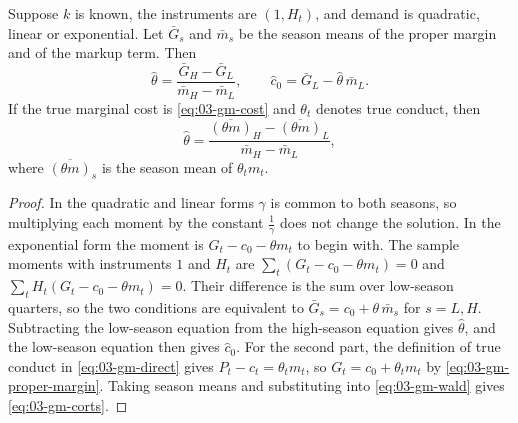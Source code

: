 \begin{proposition}\label{prop:03-gm-wald}
Suppose $k$ is known, the instruments are $(1, H_t)$, and demand is quadratic, linear or exponential. Let $\bar G_s$ and $\bar m_s$ be the season means of the proper
margin and of the markup term. Then
\begin{equation}\label{eq:03-gm-wald}
\hat\theta = \frac{\bar G_H - \bar G_L}{\bar m_H - \bar m_L},
\qquad
\hat c_0 = \bar G_L - \hat\theta\,\bar m_L .
\end{equation}
If the true marginal cost is \eqref{eq:03-gm-cost} and $\theta_t$ denotes true conduct, then
\begin{equation}\label{eq:03-gm-corts}
\hat\theta = \frac{\overline{(\theta m)}_H - \overline{(\theta m)}_L}{\bar m_H - \bar m_L},
\end{equation}
where $\overline{(\theta m)}_s$ is the season mean of $\theta_t m_t$.
\end{proposition}

\begin{proof}
In the quadratic and linear forms $\gamma$ is common to both seasons, so multiplying each moment by the
constant $\frac{1}{\gamma}$ does not change the solution. In the exponential form the moment is
$G_t - c_0 - \theta m_t$ to begin with. The sample moments with instruments $1$ and $H_t$ are
$\sum_t (G_t - c_0 - \theta m_t) = 0$ and $\sum_t H_t(G_t - c_0 - \theta m_t) = 0$. Their difference is the
sum over low-season quarters, so the two conditions are equivalent to
$\bar G_s = c_0 + \theta\,\bar m_s$ for $s = L, H$. Subtracting the low-season equation from the high-season
equation gives $\hat\theta$, and the low-season equation then gives $\hat c_0$. For the second part, the
definition of true conduct in \eqref{eq:03-gm-direct} gives $P_t - c_t = \theta_t m_t$, so $G_t = c_0 +
\theta_t m_t$ by \eqref{eq:03-gm-proper-margin}. Taking season means and substituting into
\eqref{eq:03-gm-wald} gives \eqref{eq:03-gm-corts}.
\end{proof}

